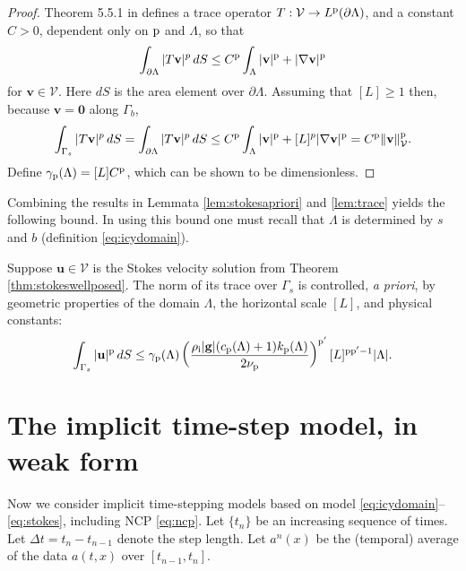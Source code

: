 \documentclass[hidelinks,onefignum,onetabnum,final]{siamart220329}  %
\newcommand{\grad}{\nabla}
\newcommand{\bg}{\mathbf{g}}
\newcommand{\bu}{\mathbf{u}}
\newcommand{\bv}{\mathbf{v}}
\newcommand{\bzero}{\bm{0}}
\newcommand{\cV}{\mathcal{V}}
\newcommand{\pp}{{\text{\textnormal{p}}}}
\newcommand{\rhoi}{\rho_{\text{i}}}
\begin{document}
\begin{proof}
Theorem 5.5.1 in \cite{Evans2010} defines a trace operator $T:\cV\to L^\pp(\partial\Lambda)$, and a constant $C>0$, dependent only on $\pp$ and $\Lambda$, so that
\begin{equation}
\int_{\partial\Lambda} |T\bv|^p\,dS \le C^\pp \int_{\Lambda} |\bv|^\pp + |\grad\bv|^\pp \label{eq:tracework}
\end{equation}
for $\bv\in\cV$.  Here $dS$ is the area element over $\partial\Lambda$.  Assuming that $[L] \ge 1$ then, because $\bv=\bzero$ along $\Gamma_b$,
\begin{equation}
\int_{\Gamma_s} |T\bv|^p\,dS = \int_{\partial\Lambda} |T\bv|^p\,dS \le C^\pp \int_{\Lambda} |\bv|^\pp + [L]^p |\grad\bv|^\pp = C^\pp \|\bv\|_{\cV}^\pp. \label{eq:traceworktwo}
\end{equation}
Define $\gamma_{\pp}(\Lambda)=[L] C^\pp$, which can be shown to be dimensionless.
\end{proof}

Combining the results in Lemmata \ref{lem:stokesapriori} and \ref{lem:trace} yields the following bound.  In using this bound one must recall that $\Lambda$ is determined by $s$ and $b$ (definition \eqref{eq:icydomain}).

\begin{corollary} \label{cor:surfacetracebound}
Suppose $\bu\in\cV$ is the Stokes velocity solution from Theorem \ref{thm:stokeswellposed}.  The norm of its trace over $\Gamma_s$ is controlled, \emph{a priori}, by geometric properties of the domain $\Lambda$, the horizontal scale $[L]$, and physical constants:
\begin{equation}
\int_{\Gamma_s} |\bu|^\pp \,dS \le \gamma_{\pp}(\Lambda) \left(\frac{\rhoi |\bg| (c_{\pp}(\Lambda) + 1) k_{\pp}(\Lambda)}{2 \nu_\pp}\right)^{\pp'} [L]^{\pp\pp'-1} |\Lambda|. \label{eq:surfacetracebound}
\end{equation}
\end{corollary}


\section{The implicit time-step model, in weak form} \label{sec:model}

Now we consider implicit time-stepping models based on model \eqref{eq:icydomain}--\eqref{eq:stokes}, including NCP \eqref{eq:ncp}.  Let $\{t_n\}$ be an increasing sequence of times.  Let $\Delta t = t_n-t_{n-1}$ denote the step length.  Let $a^n(x)$ be the (temporal) average of the data $a(t,x)$ over $[t_{n-1},t_n]$.
\end{document}
